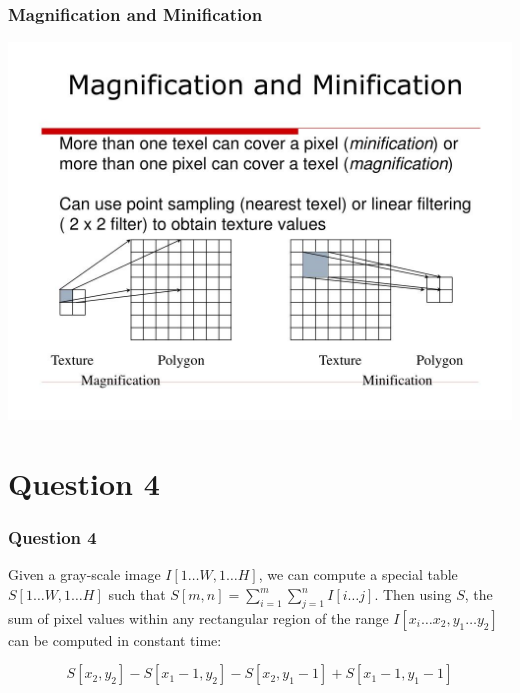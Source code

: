 \documentclass{beamer}
\begin{document}
\begin{frame}
    \frametitle{Magnification and Minification}

    \begin{center}
        \includegraphics[scale=0.3]{tex_mag-min.jpg}
    \end{center}

\end{frame}

\section{Question 4}

\begin{frame}
    \frametitle{Question 4}

    Given a gray-scale image $I [1 \dots W, 1\dots H]$, we can compute a special table $S[1 \dots W, 1 \dots H]$ such that
    $S[m,n] = \sum_{i=1}^m \sum_{j=1}^n I[i \dots j]$. Then using $S$, the sum of pixel values within
    any rectangular region of the range $I[x_i \dots x_2, y_1 \dots y_2]$ can be computed in constant time:

    \vspace{1em}

    \begin{tcolorbox}
        \begin{equation*} 
            S[x_2, y_2] - S[x_1 - 1, y_2] - S[x_2, y_1 - 1] + S[x_1 - 1, y_1 - 1]
        \end{equation*}
    \end{tcolorbox}
\end{frame}
\end{document}
